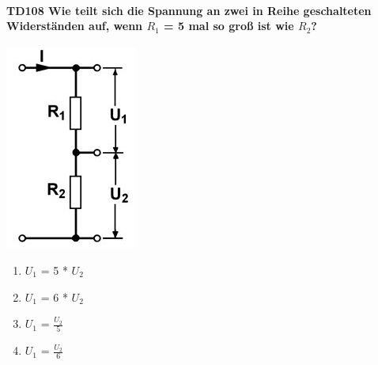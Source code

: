 \documentclass[8pt]{article}
\begin{document}
\begin{enumerate}
\begin{enumerate}[nolistsep,label=\Alph*]
\paragraph*{TD108 Wie teilt sich die Spannung an zwei in Reihe geschalteten Widerständen auf, wenn $R_{1}$ = 5 mal so groß ist wie $R_{2}$?}
\begin{center}
	\begin{minipage}{\linewidth}
		\centering
		\includegraphics[scale=1.0]{pics/td108_a.jpg}
	\end{minipage}
\end{center}
\begin{enumerate}[nolistsep,label=\Alph*]
\item $U_{1}$ = 5 * $U_{2}$
\item $U_{1}$ = 6 * $U_{2}$
\item $U_{1}$ = $\frac{U_{2}}{5}$
\item $U_{1}$ = $\frac{U_{2}}{6}$
\end{enumerate}


\end{enumerate}
\end{enumerate}
\end{document}

